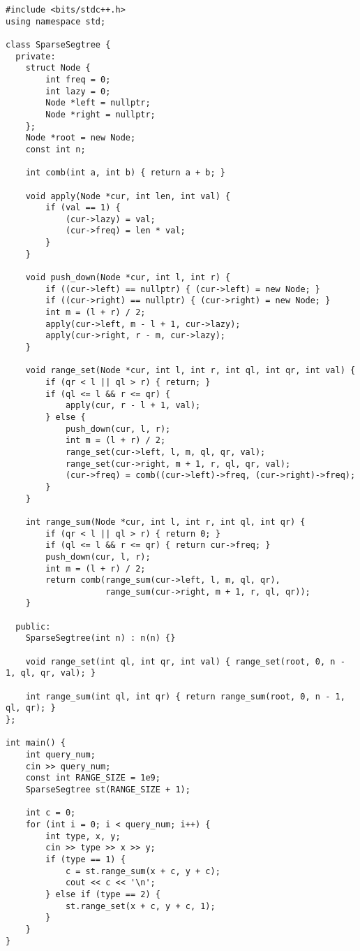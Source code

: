 \documentclass{article}
\begin{document}
\begin{verbatim}
#include <bits/stdc++.h>
using namespace std;

class SparseSegtree {
  private:
	struct Node {
		int freq = 0;
		int lazy = 0;
		Node *left = nullptr;
		Node *right = nullptr;
	};
	Node *root = new Node;
	const int n;

	int comb(int a, int b) { return a + b; }

	void apply(Node *cur, int len, int val) {
		if (val == 1) {
			(cur->lazy) = val;
			(cur->freq) = len * val;
		}
	}

	void push_down(Node *cur, int l, int r) {
		if ((cur->left) == nullptr) { (cur->left) = new Node; }
		if ((cur->right) == nullptr) { (cur->right) = new Node; }
		int m = (l + r) / 2;
		apply(cur->left, m - l + 1, cur->lazy);
		apply(cur->right, r - m, cur->lazy);
	}

	void range_set(Node *cur, int l, int r, int ql, int qr, int val) {
		if (qr < l || ql > r) { return; }
		if (ql <= l && r <= qr) {
			apply(cur, r - l + 1, val);
		} else {
			push_down(cur, l, r);
			int m = (l + r) / 2;
			range_set(cur->left, l, m, ql, qr, val);
			range_set(cur->right, m + 1, r, ql, qr, val);
			(cur->freq) = comb((cur->left)->freq, (cur->right)->freq);
		}
	}

	int range_sum(Node *cur, int l, int r, int ql, int qr) {
		if (qr < l || ql > r) { return 0; }
		if (ql <= l && r <= qr) { return cur->freq; }
		push_down(cur, l, r);
		int m = (l + r) / 2;
		return comb(range_sum(cur->left, l, m, ql, qr),
		            range_sum(cur->right, m + 1, r, ql, qr));
	}

  public:
	SparseSegtree(int n) : n(n) {}

	void range_set(int ql, int qr, int val) { range_set(root, 0, n - 1, ql, qr, val); }

	int range_sum(int ql, int qr) { return range_sum(root, 0, n - 1, ql, qr); }
};

int main() {
	int query_num;
	cin >> query_num;
	const int RANGE_SIZE = 1e9;
	SparseSegtree st(RANGE_SIZE + 1);

	int c = 0;
	for (int i = 0; i < query_num; i++) {
		int type, x, y;
		cin >> type >> x >> y;
		if (type == 1) {
			c = st.range_sum(x + c, y + c);
			cout << c << '\n';
		} else if (type == 2) {
			st.range_set(x + c, y + c, 1);
		}
	}
}
\end{verbatim}
\end{document}
